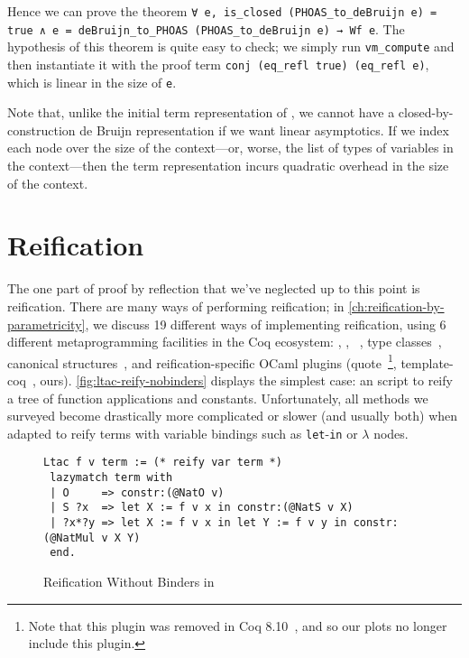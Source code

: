 Hence we can prove the theorem \texttt{∀ e, is\_closed (PHOAS\_to\_deBruijn e) = true ∧ e = deBruijn\_to\_PHOAS (PHOAS\_to\_deBruijn e) → Wf e}.
The hypothesis of this theorem is quite easy to check; we simply run \texttt{vm_compute} and then instantiate it with the proof term \texttt{conj (eq_refl true) (eq_refl e)}, which is linear in the size of \texttt{e}.

Note that, unlike the initial term representation of \textcite{ImpurePOPL10}, we cannot have a closed-by-construction de Bruijn representation if we want linear asymptotics.
If we index each node over the size of the context---or, worse, the list of types of variables in the context---then the term representation incurs quadratic overhead in the size of the context.

\section{Reification}\label{sec:reif-survey}\label{sec:reif-intro}


The one part of proof by reflection that we've neglected up to this point is reification.
There are many ways of performing reification; in \autoref{ch:reification-by-parametricity}, we discuss 19 different ways of implementing reification, using 6 different metaprogramming facilities in the Coq ecosystem: \Ltac, \LtacTwo, \MtacTwo~\cite{lessadhoc,Mtac2}, type classes~\cite{sozeau2008first}, canonical structures~\cite{gonthier2016small}, and reification-specific OCaml plugins (quote~\cite{quote-plugin}\footnote{Note that this plugin was removed in Coq 8.10~\cite{coq-pr-remove-quote-plugin}, and so our plots no longer include this plugin.}, template-coq~\cite{TemplateCoq}, ours).
\autoref{fig:ltac-reify-nobinders} displays the simplest case: an \Ltac\space script to reify a tree of function applications and constants.
Unfortunately, all methods we surveyed become drastically more complicated or slower (and usually both) when adapted to reify terms with variable bindings such as \texttt{let}-\texttt{in} or \texttt{$\lambda$} nodes.

\begin{figure}%
\begin{verbatim}
Ltac f v term := (* reify var term *)
 lazymatch term with
 | O     => constr:(@NatO v)
 | S ?x  => let X := f v x in constr:(@NatS v X)
 | ?x*?y => let X := f v x in let Y := f v y in constr:(@NatMul v X Y)
 end.
\end{verbatim}
\caption{Reification Without Binders in~\Ltac}\label{fig:ltac-reify-nobinders}
\end{figure}%

